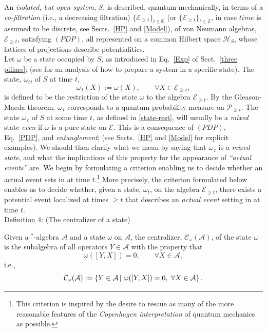 \documentclass[12pt]{article}
\begin{document}
An \textit{isolated, but open system}, $S$, is described, quantum-mechanically, in terms of a \textit{co-filtration} (i.e., a decreasing filtration)
$\lbrace \mathcal{E}_{\geq t} \rbrace_{t \in \mathbb{R}}$ (or $\lbrace \mathcal{E}_{\geq t} \rbrace_{t \in \mathbb{Z}}$, in case $time$ is assumed to be discrete, see Sects.~\ref{HP} and \ref{Model}), of von 
Neumann algebras, $\mathcal{E}_{\geq t}$, satisfying $(PDP)$, all represented on a common Hilbert space $\mathcal{H}_S$, 
whose lattices of projections describe potentialities. \\

Let $\omega$ be a state occupied by $S$, as introduced in Eq.~\eqref{Exp} of Sect.~\ref{three pillars}; (see \cite{Fr-Schub} for an analysis of how to prepare a system in a specific state). The state, 
$\omega_t$, of $S$ at time $t$,
\begin{equation}\label{state-rest}
\omega_{\,t}(X):= \omega(X), \qquad \forall X \in \mathcal{E}_{\geq t},
\end{equation}
is defined to be the restriction of the state $\omega$ to the algebra $\mathcal{E}_{\geq t}$. By the Gleason-Maeda theorem, 
$\omega_{\,t}$  
corresponds to a quantum probability measure on $\mathcal{P}_{\geq t}$. The state $\omega_{\,t}$ of $S$ 
at some time $t$, as defined in \eqref{state-rest}, will usually be a \textit{mixed} state  \textit{even} if $\omega$ 
is a pure state on $\mathcal{E}$. This is a consequence of $(PDP)$, Eq.~\eqref{PDP}, and \textit{entanglement}; (see Sects.~\ref{HP} and \ref{Model} for explicit examples). We should then clarify what we mean by saying that
$\omega_{\,t}$ is a \textit{mixed state}, and what the implications of this property for the appearance 
of \textit{``actual events''} are.
We begin by formulating a criterion enabling us to decide whether an actual event sets in at time 
$t$.\footnote{This criterion is inspired by the desire to rescue as many of the more reasonable features of the \textit{Copenhagen interpretation} of quantum mechanics as possible.} More precisely, the criterion formulated below 
enables us to decide whether, given a state, $\omega_t$, on the algebra $\mathcal{E}_{\geq t}$, there exists a potential 
event localized at times $\geq t$ that describes an \textit{actual event} setting in at time $t$.\\

{Definition 4}: (The centralizer of a state) \label{defcentralizer}

Given a $^{*}$-algebra $\mathcal{A}$ and a state $\omega$ on $\mathcal{A}$, the centralizer, 
$\mathcal{C}_{\omega}(\mathcal{A})$, of the state $\omega$ is the subalgebra of all operators $Y \in \mathcal{A}$ 
with the property that 
$$\omega([Y, X]) =0, \qquad \forall X \in \mathcal{A},$$
i.e.,
$$\hspace{2.8cm}\mathcal{C}_{\omega}(\mathcal{A}):=\left\{Y\in \mathcal{A}\, \vert \,\,\omega([Y, X]) =0, \,\,\forall X \in \mathcal{A}\right\} . 
\hspace{2.8cm} \square$$
\end{document}
